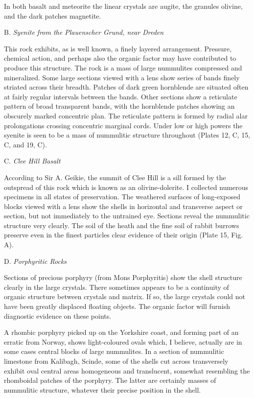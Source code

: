 \documentclass[a4paper, 12pt, oneside, landscape]{article}
\begin{document}
In both basalt and meteorite the linear crystals are augite, the granules olivine, and the dark patches magnetite.

\bigskip
\centerline{B. \emph{Syenite from the Plauenscher Grund, near Dreden}}

This rock exhibits, as is well known, a finely layered arrangement. Pressure, chemical action, and perhaps also the organic factor may have contributed to produce this structure. The rock is a mass of large nummulites compressed and mineralized. Some large sections viewed with a lens show series of bands finely striated across their breadth. Patches of dark green hornblende are situated often at fairly regular intervals between the bands. Other sections show a reticulate pattern of broad transparent bands, with the hornblende patches showing an obscurely marked concentric plan. The reticulate pattern is formed by radial alar prolongations crossing concentric marginal cords. Under low or high powers the syenite is seen to be a mass of nummulitic structure throughout (Plates 12, C, 15, C, and 19, C).

\bigskip
\centerline{C. \emph{Clee Hill Basalt}}

According to Sir A. Geikie, the summit of Clee Hill is a sill formed by the outspread of this rock which is known as an olivine-dolerite. I collected numerous specimens in all states of preservation. The weathered surfaces of long-exposed blocks viewed with a lens show the shells in horizontal and transverse aspect or section, but not immediately to the untrained eye. Sections reveal the nummulitic structure very clearly. The soil of the heath and the fine soil of rabbit burrows preserve even in the finest particles clear evidence of their origin (Plate 15, Fig. A).

\bigskip
\centerline{D. \emph{Porphyritic Rocks}}

Sections of precious porphyry (from Mons Porphyritis) show the shell structure clearly in the large crystals. There sometimes appears to be a continuity of organic structure between crystals and matrix. If so, the large crystals could not have been greatly displaced floating objects. The organic factor will furnish diagnostic evidence on these points.

A rhombic porphyry picked up on the Yorkshire coast, and forming part of an erratic from Norway, shows light-coloured ovals which, I believe, actually are in some cases central blocks of large nummulites. In a section of nummulitic limestone from Kalibagh, Scinde, some of the shells cut across transversely exhibit oval central areas homogeneous and translucent, somewhat resembling the rhomboidal patches of the porphyry. The latter are certainly masses of nummulitic structure, whatever their precise position in the shell.
\end{document}
